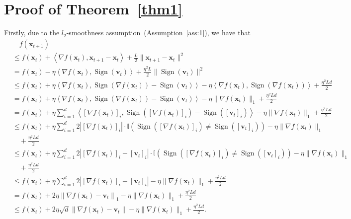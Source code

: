 \documentclass{article}
\DeclareMathOperator{\sign}{sign}
\newcommand{\Norm}[1]{\left\|#1\right\|}
\def \v {\mathbf{v}}
\def \x {\mathbf{x}}
\def \sign  {\operatorname{Sign}}
\def \x {\mathbf{x}}
\def \v {\mathbf{v}}
\begin{document}
\section{Proof of Theorem~\ref{thm1}}
Firstly, due to the $l_2$-smoothness assumption~(Assumption~\ref{ass:1}), we have that
\begin{equation}\label{L-smooth}
\begin{aligned}
 & \quad f(\x_{t+1}) \\
&\leq f(\x_t) + \left\langle \nabla f(\x_t), \x_{t+1} - \x_t \right\rangle + \frac{L}{2} \| \x_{t+1} - \x_t \|^2 \\
&= f(\x_t) -\eta \left\langle \nabla f(\x_t),  \sign(\v_t) \right\rangle + \frac{\eta^2 L}{2} \| \sign(\v_t) \|^2 \\
&\leq f(\x_t) + \eta\left\langle \nabla f(\x_t),  \sign(\nabla f(\x_t)) -  \sign(\v_t) \right\rangle - \eta \left\langle \nabla f(\x_t), \sign(\nabla f(\x_t)) \right\rangle  + \frac{\eta^2 L d}{2} \\
&= f(\x_t) +\eta\left\langle \nabla f(\x_t),  \sign(\nabla f(\x_t)) -  \sign(\v_t) \right\rangle  - \eta \| \nabla f(\x_t) \|_1 + \frac{\eta^2 L d}{2} \\
&= f(\x_t) +\eta \sum_{i=1}^{d} \left\langle [\nabla f(\x_t)]_i, \sign([\nabla f(\x_t)]_i) - \sign([\v_t]_i) \right\rangle  - \eta \| \nabla f(\x_t) \|_1 + \frac{\eta^2 L d}{2}\\
&\leq f(\x_t) +\eta\sum_{i=1}^{d} 2\left|[\nabla f(\x_t)]_i\right| \cdot \mathbb{I} \left( \sign(\left[\nabla f(\x_t)\right]_i) \neq \sign([\v_t]_i) \right)  - \eta \| \nabla f(\x_t) \|_1\\
&\quad + \frac{\eta^2 L d}{2}\\
&\leq f(\x_t) +\eta\sum_{i=1}^{d} 2|[\nabla f(\x_t)]_i - [\v_t]_i| \cdot \mathbb{I} \left( \sign(\left[\nabla f(\x_t)\right]_i) \neq \sign([\v_t]_i) \right) - \eta \| \nabla f(\x_t) \|_1 \\
&\quad + \frac{\eta^2 L d}{2}\\
&\leq f(\x_t) +\eta\sum_{i=1}^{d} 2|[\nabla f(\x_t)]_i - [\v_t]_i|  - \eta \| \nabla f(\x_t) \|_1 + \frac{\eta^2 L d}{2}\\
&= f(\x_t) +2\eta\Norm{\nabla f(\x_t) - \v_t}_1  - \eta \| \nabla f(\x_t) \|_1 + \frac{\eta^2 L d}{2}\\
&\leq f(\x_t) +2\eta\sqrt{d} \Norm{\nabla f(\x_t) - \v_t}  - \eta \| \nabla f(\x_t) \|_1 + \frac{\eta^2 L d}{2}.
\end{aligned}
\end{equation}
\end{document}
